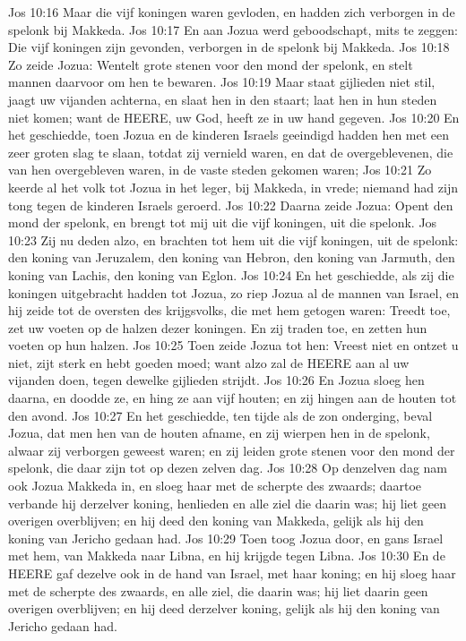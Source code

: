 Jos 10:16  Maar die vijf koningen waren gevloden, en hadden zich verborgen in de spelonk bij Makkeda.
Jos 10:17  En aan Jozua werd geboodschapt, mits te zeggen: Die vijf koningen zijn gevonden, verborgen in de spelonk bij Makkeda.
Jos 10:18  Zo zeide Jozua: Wentelt grote stenen voor den mond der spelonk, en stelt mannen daarvoor om hen te bewaren.
Jos 10:19  Maar staat gijlieden niet stil, jaagt uw vijanden achterna, en slaat hen in den staart; laat hen in hun steden niet komen; want de HEERE, uw God, heeft ze in uw hand gegeven.
Jos 10:20  En het geschiedde, toen Jozua en de kinderen Israels geeindigd hadden hen met een zeer groten slag te slaan, totdat zij vernield waren, en dat de overgeblevenen, die van hen overgebleven waren, in de vaste steden gekomen waren;
Jos 10:21  Zo keerde al het volk tot Jozua in het leger, bij Makkeda, in vrede; niemand had zijn tong tegen de kinderen Israels geroerd.
Jos 10:22  Daarna zeide Jozua: Opent den mond der spelonk, en brengt tot mij uit die vijf koningen, uit die spelonk.
Jos 10:23  Zij nu deden alzo, en brachten tot hem uit die vijf koningen, uit de spelonk: den koning van Jeruzalem, den koning van Hebron, den koning van Jarmuth, den koning van Lachis, den koning van Eglon.
Jos 10:24  En het geschiedde, als zij die koningen uitgebracht hadden tot Jozua, zo riep Jozua al de mannen van Israel, en hij zeide tot de oversten des krijgsvolks, die met hem getogen waren: Treedt toe, zet uw voeten op de halzen dezer koningen. En zij traden toe, en zetten hun voeten op hun halzen.
Jos 10:25  Toen zeide Jozua tot hen: Vreest niet en ontzet u niet, zijt sterk en hebt goeden moed; want alzo zal de HEERE aan al uw vijanden doen, tegen dewelke gijlieden strijdt.
Jos 10:26  En Jozua sloeg hen daarna, en doodde ze, en hing ze aan vijf houten; en zij hingen aan de houten tot den avond.
Jos 10:27  En het geschiedde, ten tijde als de zon onderging, beval Jozua, dat men hen van de houten afname, en zij wierpen hen in de spelonk, alwaar zij verborgen geweest waren; en zij leiden grote stenen voor den mond der spelonk, die daar zijn tot op dezen zelven dag.
Jos 10:28  Op denzelven dag nam ook Jozua Makkeda in, en sloeg haar met de scherpte des zwaards; daartoe verbande hij derzelver koning, henlieden en alle ziel die daarin was; hij liet geen overigen overblijven; en hij deed den koning van Makkeda, gelijk als hij den koning van Jericho gedaan had.
Jos 10:29  Toen toog Jozua door, en gans Israel met hem, van Makkeda naar Libna, en hij krijgde tegen Libna.
Jos 10:30  En de HEERE gaf dezelve ook in de hand van Israel, met haar koning; en hij sloeg haar met de scherpte des zwaards, en alle ziel, die daarin was; hij liet daarin geen overigen overblijven; en hij deed derzelver koning, gelijk als hij den koning van Jericho gedaan had.

